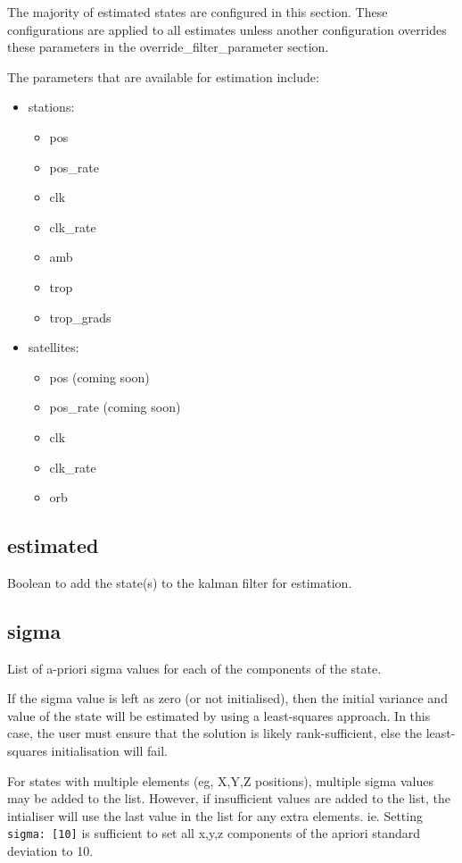 The majority of estimated states are configured in this section. These configurations are applied to all estimates unless another configuration overrides these parameters in the override\_filter\_parameter section.

The parameters that are available for estimation include:
\begin{itemize}
\item stations:
\begin{itemize}
\item pos
\item pos\_rate
\item clk
\item clk\_rate
\item amb
\item trop
\item trop\_grads
\end{itemize}
\item satellites:
\begin{itemize}
\item pos (coming soon)
\item pos\_rate (coming soon)
\item clk
\item clk\_rate
\item orb
\end{itemize}
\end{itemize}


\subsection*{estimated}

Boolean to add the state(s) to the kalman filter for estimation.

\subsection*{sigma}

List of a-priori sigma values for each of the components of the state.

If the sigma value is left as zero (or not initialised), then the initial variance and value of the state will be estimated by using a least-squares approach.
In this case, the user must ensure that the solution is likely rank-sufficient, else the least-squares initialisation will fail.

For states with multiple elements (eg, X,Y,Z positions), multiple sigma values may be added to the list. However, if insufficient values are added to the list, the intialiser will use the last value in the list for any extra elements.
ie. Setting \lstinline{sigma: [10]} is sufficient to set all x,y,z components of the apriori standard deviation to 10.

